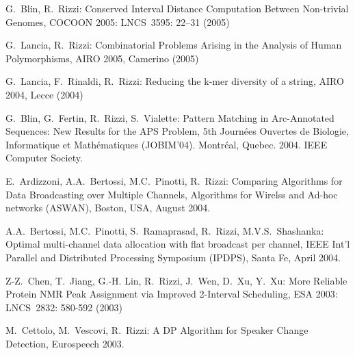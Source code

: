 \begin{etaremune}
\vspace{-1.8mm}
  \item {G.~Blin, R.~Rizzi:}
   \newblock Conserved Interval Distance Computation Between Non-trivial Genomes,
   \newblock COCOON 2005:
   \newblock  LNCS~3595: 22--31 (2005)

\vspace{-1.8mm}
  \item {G.~Lancia, R.~Rizzi:}
   \newblock Combinatorial Problems Arising in the Analysis of Human Polymorphisms,
   \newblock AIRO 2005, Camerino (2005)

\vspace{-1.8mm}
  \item {G.~Lancia, F.~Rinaldi, R.~Rizzi:}
   \newblock Reducing the k-mer diversity of a string,
   \newblock AIRO 2004, Lecce (2004)

\vspace{-1.8mm}
  \item {G.~Blin, G.~Fertin, R.~Rizzi, S.~Vialette:}
   \newblock Pattern Matching in Arc-Annotated Sequences: New Results for the APS Problem,
   \newblock 5th Journ\'ees Ouvertes de Biologie, Informatique et Math\'ematiques (JOBIM'04).
   \newblock Montr\'eal, Quebec. 2004.
   \newblock IEEE Computer Society.

\vspace{-1.8mm}
  \item {E.~Ardizzoni, A.A.~Bertossi, M.C.~Pinotti, R.~Rizzi:}
   \newblock Comparing Algorithms for Data Broadcasting over Multiple Channels,
   \newblock Algorithms for Wirelss and Ad-hoc networks (ASWAN),
   \newblock Boston, USA, August 2004.

\vspace{-1.8mm}
  \item {A.A.~Bertossi, M.C.~Pinotti, S.~Ramaprasad, R.~Rizzi, M.V.S.~Shashanka:}
   \newblock Optimal multi-channel data allocation with flat broadcast per channel,
   \newblock IEEE Int’l Parallel and Distributed Processing Symposium (IPDPS),
   \newblock Santa Fe, April 2004.

\vspace{-1.8mm}
  \item {Z-Z.~Chen, T.~Jiang, G.-H. Lin, R.~Rizzi, J.~Wen, D.~Xu, Y.~Xu:}
   \newblock More Reliable Protein NMR Peak Assignment via Improved 2-Interval Scheduling,
   \newblock ESA 2003:
   \newblock LNCS~2832: 580-592 (2003)

\vspace{-1.8mm}
  \item {M.~Cettolo, M.~Vescovi, R.~Rizzi:}
   \newblock  A DP Algorithm  for Speaker Change Detection,
   \newblock Eurospeech 2003.


\end{etaremune}

